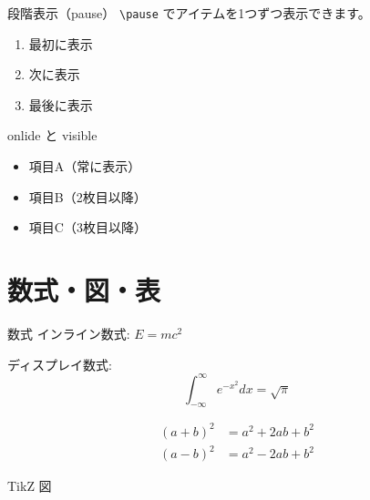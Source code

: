 \documentclass[lualatex, unicode]{beamer}
\begin{document}
\begin{frame}{段階表示（pause）}
  \texttt{\textbackslash pause} でアイテムを1つずつ表示できます。

  \begin{enumerate}
    \item 最初に表示 \pause
    \item 次に表示 \pause
    \item 最後に表示
  \end{enumerate}
\end{frame}

\begin{frame}{onlide と visible}



  \begin{itemize}
    \item<1-> 項目A（常に表示）
    \item<2-> 項目B（2枚目以降）
    \item<3-> 項目C（3枚目以降）
  \end{itemize}
\end{frame}

\section{数式・図・表}

\begin{frame}{数式}
  インライン数式: $E = mc^2$

  ディスプレイ数式:
  \[
    \int_{-\infty}^{\infty} e^{-x^2} dx = \sqrt{\pi}
  \]

  \begin{align*}
    (a+b)^2 &= a^2 + 2ab + b^2 \\
    (a-b)^2 &= a^2 - 2ab + b^2
  \end{align*}
\end{frame}

\begin{frame}{TikZ 図}
  \begin{center}
  \end{center}
\end{frame}
\end{document}
